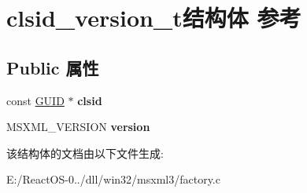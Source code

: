 \hypertarget{structclsid__version__t}{}\section{clsid\+\_\+version\+\_\+t结构体 参考}
\label{structclsid__version__t}
\subsection*{Public 属性}
\begin{DoxyCompactItemize}
\item 
\mbox{\label{structclsid__version__t_a023f1b9d4c88b2114085233ec77f8800}} 
const \hyperlink{interface_g_u_i_d}{G\+U\+ID} $\ast$ {\bfseries clsid}
\item 
\mbox{\label{structclsid__version__t_a80aa5304cf65702d4285153733274b7e}} 
M\+S\+X\+M\+L\+\_\+\+V\+E\+R\+S\+I\+ON {\bfseries version}
\end{DoxyCompactItemize}


该结构体的文档由以下文件生成\+:\begin{DoxyCompactItemize}
\item 
E\+:/\+React\+O\+S-\/0../dll/win32/msxml3/factory.\+c\end{DoxyCompactItemize}
